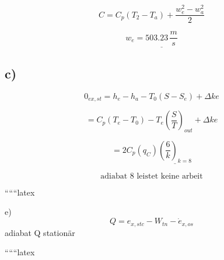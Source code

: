 \[
C = C_p (T_2 - T_a) + \frac{w_e^2 - w_a^2}{2}
\]

\[
w_e = \underline{503.23 \, \frac{m}{s}}
\]

\subsection*{c)}

\[
0_{ex,st} = h_e - h_a - T_0 (S - S_e) + \Delta ke
\]

\[
= C_p (T_e - T_0) - T_e \left( \frac{S}{T} \right)_{out} + \Delta ke
\]

\[
= 2 C_p (q_C) \underline{\left( \frac{6}{k} \right)_{k=8}}
\]

\[
\text{adiabat 8 leistet keine arbeit}
\]

``````latex


e) \\
\[
Q = e_{x,stc} - W_{tn} - \dot{e}_{x,os}
\]
adiabat Q stationär

``````latex


